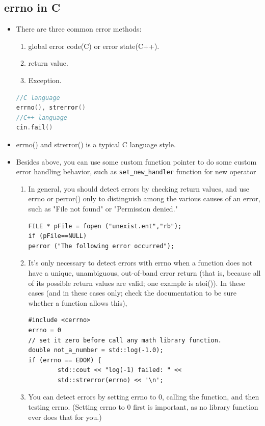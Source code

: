 \documentclass[a4paper,11pt,twoside]{book}
\begin{document}
\subsection{errno in C}
\begin{itemize}
	
	\item There are three common error methods:
	\begin{enumerate}
		\item global error code(C) or error state(C++).
		\item return value.
		\item Exception.
	\end{enumerate}
\begin{lstlisting}[frame=single, language=c++]
//C language
errno(), strerror()
//C++ language
cin.fail()
\end{lstlisting}

	
	\item errno() and strerror() is a typical C language style.
	
	
	\item Besides above, you can use some custom function pointer to do some custom error handling behavior, such as \texttt{set\_new\_handler} function for new operator
	
	\begin{enumerate}
		\item In general, you should detect errors by checking return values, and use errno or perror() only to distinguish among the various causes of an error, such as "File not found" or "Permission denied."
		
\begin{lstlisting}[numbers=none]
FILE * pFile = fopen ("unexist.ent","rb");
if (pFile==NULL)
perror ("The following error occurred");
\end{lstlisting}
		
		\item It's only necessary to detect errors with errno when a function does not have a unique, unambiguous, out-of-band error return (that is, because all of its possible return values are valid; one example is atoi()). In these cases (and in these cases only; check the documentation to be sure whether a function allows this),
\begin{lstlisting}[numbers=none]
#include <cerrno>
errno = 0
// set it zero before call any math library function.
double not_a_number = std::log(-1.0);
if (errno == EDOM) {
		std::cout << "log(-1) failed: " <<
		std::strerror(errno) << '\n';
\end{lstlisting}
		\item You can detect errors by setting errno to 0, calling the function, and then testing errno. (Setting errno to 0 first is important, as no library function ever does that for you.)
	\end{enumerate}
	

\end{itemize}
\end{document}
